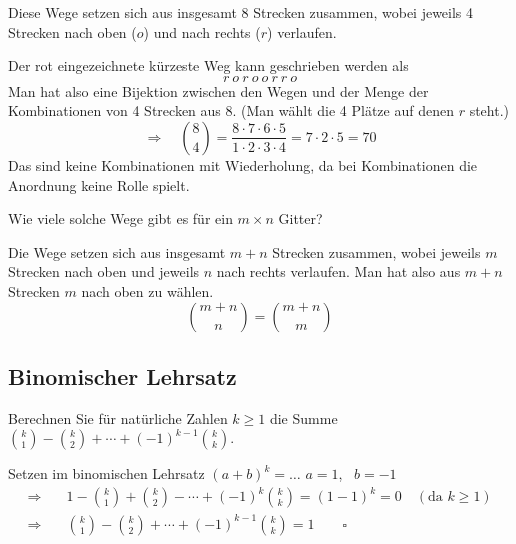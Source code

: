 \begin{loesung}
Diese Wege setzen sich aus insgesamt 8 Strecken zusammen, wobei jeweils 4 Strecken nach oben ($o$) und nach rechts ($r$) verlaufen.

Der rot eingezeichnete kürzeste Weg kann geschrieben werden als
\[
r\ o\ r\ o\ o\ r\ r\ o
\]
Man hat also eine Bijektion zwischen den Wegen und der Menge der Kombinationen von 4 Strecken aus 8. (Man wählt die 4 Plätze auf denen $r$ steht.)
\[
\Rightarrow\quad \binom{8}{4} = \frac{8 \cdot 7 \cdot 6 \cdot 5}{1 \cdot 2 \cdot 3 \cdot 4} = 7 \cdot 2 \cdot 5 = 70
\]
Das sind keine Kombinationen mit Wiederholung, da bei Kombinationen die Anordnung keine Rolle spielt.
\end{loesung}

\begin{aufgabe}[Aufgabe 5]
Wie viele solche Wege gibt es für ein $m \times n$ Gitter?
\end{aufgabe}

\begin{loesung}
Die Wege setzen sich aus insgesamt $m+n$ Strecken zusammen, wobei jeweils $m$ Strecken nach oben und jeweils $n$ nach rechts verlaufen. Man hat also aus $m + n$ Strecken $m$ nach oben zu wählen.
\[
\binom{m+n}{n} = \binom{m+n}{m}
\]
\end{loesung}

\subsection{Binomischer Lehrsatz}

\begin{aufgabe}[Aufgabe 6]
Berechnen Sie für natürliche Zahlen $k \geq 1$ die Summe $\binom{k}{1} - \binom{k}{2} + \cdots + (-1)^{k-1}\binom{k}{k}$.
\end{aufgabe}

\begin{loesung}
Setzen im binomischen Lehrsatz $(a + b)^k = \ldots$ \quad $a = 1$, \ $b = -1$
\begin{align*}
\Rightarrow\quad & 1 - \binom{k}{1} + \binom{k}{2} - \cdots + (-1)^k \binom{k}{k} = (1 - 1)^k = 0 \quad (\text{da } k \geq 1)\\
\Rightarrow\quad & \binom{k}{1} - \binom{k}{2} + \cdots + (-1)^{k-1} \binom{k}{k} = 1 \qquad \square
\end{align*}
\end{loesung}

